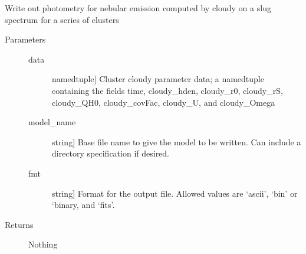 \documentclass[letterpaper,10pt,english]{sphinxmanual}
\begin{document}

\begin{fulllineitems}
\label{cloudy:slugpy.cloudy.write_integrated_cloudyparams}
Write out photometry for nebular emission computed by cloudy on a
slug spectrum for a series of clusters
\begin{description}
\item[{Parameters}] \leavevmode\begin{description}
\item[{data}] \leavevmode{[}namedtuple{]}
Cluster cloudy parameter data; a namedtuple containing the
fields time, cloudy\_hden, cloudy\_r0, cloudy\_rS, 
cloudy\_QH0, cloudy\_covFac, cloudy\_U, and cloudy\_Omega

\item[{model\_name}] \leavevmode{[}string{]}
Base file name to give the model to be written. Can include a
directory specification if desired.

\item[{fmt}] \leavevmode{[}string{]}
Format for the output file. Allowed values are `ascii', `bin'
or `binary, and `fits'.

\end{description}

\item[{Returns}] \leavevmode
Nothing

\end{description}

\end{fulllineitems}

\end{document}
